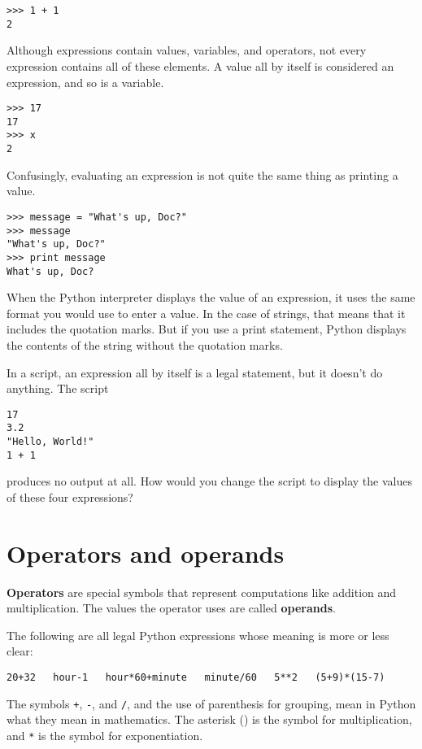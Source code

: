 \beforeverb
\begin{verbatim}
>>> 1 + 1
2
\end{verbatim}
\afterverb
%
Although expressions contain values, variables, and operators,
not every expression contains all of these elements.
A value all by itself is considered an expression, and so is
a variable.

\beforeverb
\begin{verbatim}
>>> 17
17
>>> x
2
\end{verbatim}
\afterverb
%
Confusingly, evaluating an expression is not quite the same
thing as printing a value.

\beforeverb
\begin{verbatim}
>>> message = "What's up, Doc?"
>>> message
"What's up, Doc?"
>>> print message
What's up, Doc?
\end{verbatim}
\afterverb
%
When the Python interpreter displays the value of an expression, it
uses the same format you would use to enter a value.  In the case of
strings, that means that it includes the quotation marks.  But if
you use a print statement, Python displays the contents of the string
without the quotation marks.

In a script, an expression all by itself is a legal statement, but it
doesn't do anything.  The script

\beforeverb
\begin{verbatim}
17
3.2
"Hello, World!"
1 + 1
\end{verbatim}
\afterverb
%
produces no output at all.  How would you change the script to
display the values of these four expressions?


\section{Operators and operands}

{\bf Operators} are special symbols that represent computations
like addition and multiplication.  The values the operator uses are
called {\bf operands}.

The following are all legal Python expressions whose meaning is more or
less clear:
\beforeverb
\begin{verbatim}
20+32   hour-1   hour*60+minute   minute/60   5**2   (5+9)*(15-7)
\end{verbatim}
\afterverb
%
The symbols {\tt +}, {\tt -}, and {\tt /}, and the use of parenthesis for
grouping, mean in Python what they mean in mathematics.  The asterisk
({\tt *}) is the symbol for multiplication, and {\tt **} is the symbol
for exponentiation.

